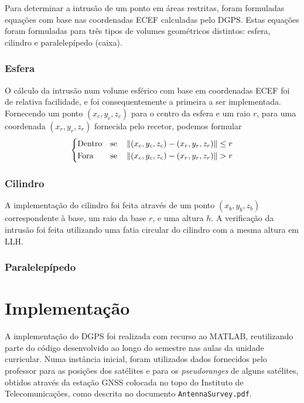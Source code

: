 \documentclass{article}
\begin{document}
Para determinar a intrusão de um ponto em áreas restritas, foram
formuladas equações com base nas coordenadas ECEF calculadas pelo
DGPS. Estas equações foram formuladas para três tipos de volumes
geométricos distintos: esfera, cilindro e paralelepípedo (caixa).

\subsubsection{Esfera}

O cálculo da intrusão num volume esférico com base em coordenadas
ECEF foi de relativa facilidade, e foi consequentemente a primeira a
ser implementada. Fornecendo um ponto $(x_c,y_c,z_c)$ para o centro
da esfera e um raio $r$, para uma coordenada $(x_r,y_r,z_r)$
fornecida pelo recetor, podemos formular
\begin{gather*}
	\begin{dcases}
		\text{Dentro} & \textrm{se}\quad \left\lVert(x_c,y_c,z_c) - 
        	(x_r,y_r,z_r)\right\rVert \leq r \\
		\text{Fora} & \textrm{se}\quad \left\lVert(x_c,y_c,z_c) - 
        	(x_r,y_r,z_r)\right\rVert > r \\
	\end{dcases}
\end{gather*}

\subsubsection{Cilindro}

A implementação do cilindro foi feita através de um ponto $(x_b,y_b,
z_b)$ correspondente à base, um raio da base $r$, e uma altura $h$.
A verificação da intrusão foi feita utilizando uma fatia circular do
cilindro com a mesma altura em LLH.

\subsubsection{Paralelepípedo}

\section{Implementação}

A implementação do DGPS foi realizada com recurso ao MATLAB,
reutilizando parte do código desenvolvido ao longo do semestre nas
aulas da unidade curricular. Numa instância inicial, foram
utilizados dados fornecidos pelo professor para as posições dos
satélites e para os \textit{pseudoranges} de alguns satélites,
obtidos através da estação GNSS colocada no topo do Instituto de
Telecomunicações, como descrita no documento
\texttt{AntennaSurvey.pdf}.
\end{document}
